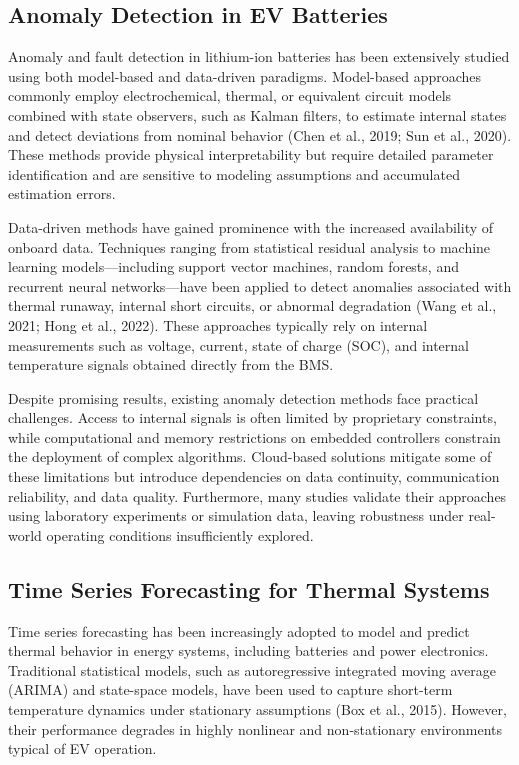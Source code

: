 \documentclass[conference]{IEEEtran}
\begin{document}
\subsection{Anomaly Detection in EV Batteries}

Anomaly and fault detection in lithium-ion batteries has been extensively studied using both model-based and data-driven paradigms. Model-based approaches commonly employ electrochemical, thermal, or equivalent circuit models combined with state observers, such as Kalman filters, to estimate internal states and detect deviations from nominal behavior (Chen et al., 2019; Sun et al., 2020). These methods provide physical interpretability but require detailed parameter identification and are sensitive to modeling assumptions and accumulated estimation errors.

Data-driven methods have gained prominence with the increased availability of onboard data. Techniques ranging from statistical residual analysis to machine learning models—including support vector machines, random forests, and recurrent neural networks—have been applied to detect anomalies associated with thermal runaway, internal short circuits, or abnormal degradation (Wang et al., 2021; Hong et al., 2022). These approaches typically rely on internal measurements such as voltage, current, state of charge (SOC), and internal temperature signals obtained directly from the BMS.

Despite promising results, existing anomaly detection methods face practical challenges. Access to internal signals is often limited by proprietary constraints, while computational and memory restrictions on embedded controllers constrain the deployment of complex algorithms. Cloud-based solutions mitigate some of these limitations but introduce dependencies on data continuity, communication reliability, and data quality. Furthermore, many studies validate their approaches using laboratory experiments or simulation data, leaving robustness under real-world operating conditions insufficiently explored.

\subsection{Time Series Forecasting for Thermal Systems}

Time series forecasting has been increasingly adopted to model and predict thermal behavior in energy systems, including batteries and power electronics. Traditional statistical models, such as autoregressive integrated moving average (ARIMA) and state-space models, have been used to capture short-term temperature dynamics under stationary assumptions (Box et al., 2015). However, their performance degrades in highly nonlinear and non-stationary environments typical of EV operation.
\end{document}
